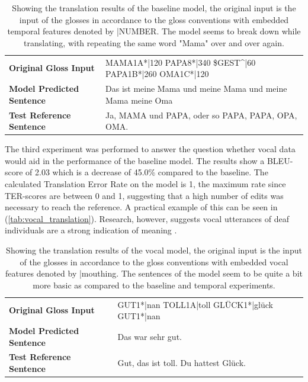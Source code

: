 \begin{table}[h]
\centering
\caption{Showing the translation results of the baseline model, the original input is the input of the glosses in accordance to the gloss conventions with embedded temporal features denoted by |NUMBER. The model seems to break down while translating, with repeating the same word "Mama" over and over again.}

\begin{tabular}{ll}
\textbf{Original Gloss Input}     &MAMA1A*|120 PAPA8*|340 \$GEST\textasciicircum{}|60 PAPA1B*|260 OMA1C*|120  \\
\textbf{Model Predicted Sentence} & Das ist meine Mama und meine Mama und meine Mama meine Oma  \\     
\textbf{Test Reference Sentence}  & Ja, MAMA und PAPA, oder so PAPA, PAPA, OPA, OMA.              \\                       \bottomrule                                                    
\end{tabular}

\label{tab:temporal_translation}
\end{table}

The third experiment was performed to answer the question whether vocal data would aid in the performance of the baseline model. The results show a BLEU-score of 2.03 which is a decrease of 45.0\% compared to the baseline. The calculated Translation Error Rate on the model is 1, the maximum rate since TER-scores are between 0 and 1, suggesting that a high number of edits was necessary to reach the reference. A practical example of this can be seen in (\autoref{tab:vocal_translation}). Research, however, suggests vocal utterances of deaf individuals are a strong indication of meaning \cite{kristoffersen2016designing}.

\begin{table}[h]
\centering
\caption{Showing the translation results of the vocal model, the original input is the input of the glosses in accordance to the gloss conventions with embedded vocal features denoted by |mouthing. The sentences of the model seem to be quite a bit more basic as compared to the baseline and temporal experiments.}

\begin{tabular}{ll}

\textbf{Original Gloss Input}     & GUT1*|nan TOLL1A|toll GLÜCK1*|glück GUT1*|nan \\
\textbf{Model Predicted Sentence} & Das war sehr gut.                                                                                     \\
\textbf{Test Reference Sentence}  & Gut, das ist toll. Du hattest Glück.        \\                                      
\bottomrule
\end{tabular}

\label{tab:vocal_translation}
\end{table}

